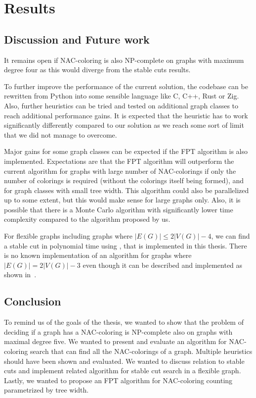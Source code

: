 
\chapter{Results}

\section{Discussion and Future work}

%
It remains open if NAC-coloring is also NP-complete on graphs with
maximum degree four as this would diverge from the stable cuts results.

To further improve the performance of the current solution, the codebase
can be rewritten from Python into some sensible language like C, C++, Rust or Zig.
Also, further heuristics can be tried
and tested on additional graph classes
to reach additional performance gains.
It is expected that the heuristic has to work significantly differently
compared to our solution as we reach some sort of limit
that we did not manage to overcome.

Major gains for some graph classes
can be expected if the FPT algorithm is also implemented.
Expectations are that the FPT algorithm will outperform the current algorithm
for graphs with large number of NAC-colorings if only the number of colorings
is required (without the colorings itself being formed), and
for graph classes with small tree width.
This algorithm could also be parallelized up to some extent,
but this would make sense for large graphs only.
%
Also, it is possible that there is a Monte Carlo algorithm with significantly
lower time complexity compared to the algorithm proposed by us.

For flexible graphs including graphs where \( |E(G)| \le 2|V(G)| - 4 \),
we can find a stable cut in polynomial time using ,
that is implemented in this thesis.
There is no known implementation of an algorithm
for graphs where \( |E(G)| = 2|V(G)| - 3 \)
even though it can be described and implemented
as shown in~\cite{stable_cuts_2v_3,stable_cuts_2v_3_revisit}.

\section{Conclusion}

To remind us of the goals of the thesis,
we wanted to show that the problem of deciding if a graph has a NAC-coloring
is NP-complete also on graphs with maximal degree five.
We wanted to present and evaluate an algorithm for NAC-coloring search
that can find all the NAC-colorings of a graph.
Multiple heuristics should have been shown and evaluated.
We wanted to discuss relation to stable cuts and implement related algorithm
for stable cut search in a flexible graph.
Lastly, we wanted to propose an FPT algorithm for NAC-coloring counting
parametrized by tree width.

